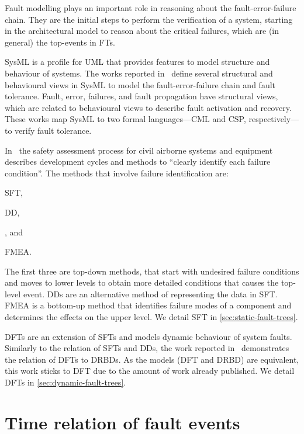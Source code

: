 \documentclass[12pt,openright,twoside,a4paper,oldfontcommands,english,brazil,final]{abntex2}
\theoremstyle{theo}
\begin{document}
Fault modelling plays an important role in reasoning about the fault-error-failure chain.
They are the initial steps to perform the verification of a system, starting in the architectural model to reason about the critical failures, which are (in general) the top-events in \acp{FT}.

\Ac{SysML} is a profile for \ac{UML} that provides features to model structure and behaviour of systems.
The works reported in~\cite{APR+2013,ADP+2013} define several structural and behavioural views in \ac{SysML} to model the fault-error-failure chain and fault tolerance.
Fault, error, failures, and fault propagation have structural views, which are related to behavioural views to describe fault activation and recovery.
These works map \ac{SysML} to two formal languages---\ac{CML} and \ac{CSP}, respectively---to verify fault tolerance.

In~\cite{SAE1996b} the safety assessment process for civil airborne systems and equipment describes development cycles and methods to ``clearly identify each failure condition''.
The methods that involve failure identification are:
\begin{alineasinline}
  \item \ac{SFT},
  \item \ac{DD},
  \item {}, and
  \item \ac{FMEA}.
\end{alineasinline}
The first three are top-down methods, that start with undesired failure conditions and moves to lower levels to obtain more detailed conditions that causes the top-level event.
\Acp{DD} are an alternative method of representing the data in \ac{SFT}.
\Ac{FMEA} is a bottom-up method that identifies failure modes of a component and determines the effects on the upper level.
We detail \ac{SFT} in \cref{sec:static-fault-trees}.

\Acp{DFT} are an extension of \acp{SFT} and models dynamic behaviour of system faults.
Similarly to the relation of \acp{SFT} and \acp{DD}, the work reported in~\cite{DP2009} demonstrates the relation of \acp{DFT} to \acp{DRBD}.
As the models (\ac{DFT} and \ac{DRBD}) are equivalent, this work sticks to \ac{DFT} due to the amount of work already published.
We detail \acp{DFT} in \cref{sec:dynamic-fault-trees}.

\section{Time relation of fault events}
\label{sec:time-relations}
\end{document}
